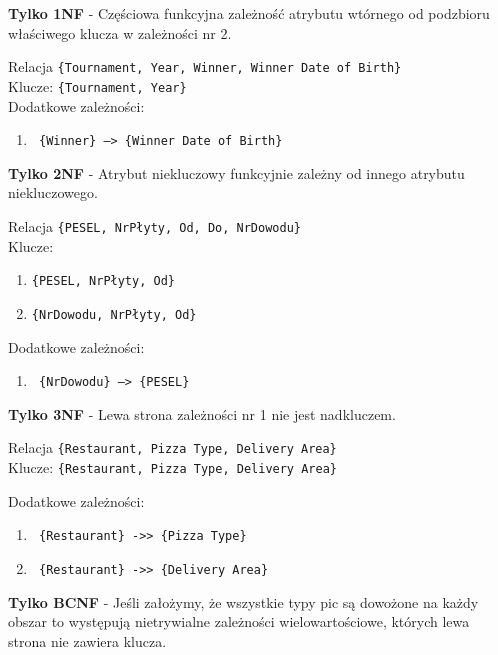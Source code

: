 \begin{tcolorbox}
    \textbf{Tylko 1NF} - Częściowa funkcyjna zależność atrybutu wtórnego od
    podzbioru właściwego klucza w zależności nr 2.
\end{tcolorbox}

\pagebreak

Relacja \texttt{\{Tournament, Year, Winner, Winner Date of Birth\}}\\
Klucze: \texttt{\{Tournament, Year\}}\\
Dodatkowe zależności:
\begin{enumerate}
    \item \texttt{ \{Winner\} --> \{Winner Date of Birth\}}
\end{enumerate}

\begin{tcolorbox}
    \textbf{Tylko 2NF} - Atrybut niekluczowy funkcyjnie zależny od innego
    atrybutu niekluczowego.
\end{tcolorbox}

\vskip 0.5cm
Relacja \texttt{\{PESEL, NrPłyty, Od, Do, NrDowodu\}}\\
Klucze:
\begin{enumerate}
    \item \texttt{\{PESEL, NrPłyty, Od\}}
    \item \texttt{\{NrDowodu, NrPłyty, Od\}}
\end{enumerate}

Dodatkowe zależności:
\begin{enumerate}
    \item \texttt{ \{NrDowodu\} --> \{PESEL\}}
\end{enumerate}

\begin{tcolorbox}
    \textbf{Tylko 3NF} - Lewa strona zależności nr 1 nie jest nadkluczem.
\end{tcolorbox}

\vskip 0.5cm
Relacja \texttt{\{Restaurant, Pizza Type, Delivery Area\}}\\
Klucze: \texttt{\{Restaurant, Pizza Type, Delivery Area\}}

Dodatkowe zależności:
\begin{enumerate}
    \item \texttt{ \{Restaurant\} ->> \{Pizza Type\}}
    \item \texttt{ \{Restaurant\} ->> \{Delivery Area\}}
\end{enumerate}

\begin{tcolorbox}
    \textbf{Tylko BCNF} - Jeśli założymy, że wszystkie typy pic są dowożone na
    każdy obszar to występują nietrywialne zależności wielowartościowe, których
    lewa strona nie zawiera klucza.
\end{tcolorbox}

